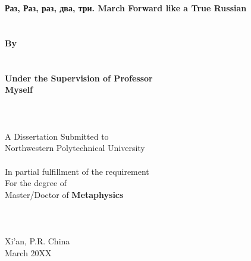 \begin{titlepage}
	\fTNR
	\begin{spacing}{1.2}
		\begin{center}
			\renewcommand{\baselinestretch}{1.2}
			\renewcommand{\captionfont}{\linespread{1.2}\normalsize}
			\setmainfont{\defaultEngFont}
			\sSanhao ~ \\
			\sSanhao ~ \\
			\fTNR \sErhao \textbf{Раз, Раз, раз, два, три. March Forward like a True Russian}
			\fSong \sXiaoer ~ \\
			\fSong \sXiaoer ~ \\
			\fSong \sXiaoer ~ \\
			\fTNR \sXiaosan \textbf{By}\\
			\fTNR \sXiaosan \textbf{\authornameInEnglish}\\
			\fSong \sXiaosan ~ \\
			\fTNR \sXiaosan \textbf{Under the Supervision of Professor}\\
			\fTNR \sXiaosan \textbf{Myself}
			\fSong \sSanhao ~ \\
			\fSong \sSanhao ~ \\
			\fSong \sSanhao ~ \\
			\fSong \sSanhao ~ \\
			\fTNR \sXiaosan A Dissertation Submitted to\\
			\fTNR \sXiaosan Northwestern Polytechnical University \\
			\fSong \sSanhao ~ \\
			\fTNR In partial fulfillment of the requirement \\
			\fTNR For the degree of \\
			\fTNR Master/Doctor of \textbf{Metaphysics}
			\fSong \sXiaosan ~ \\
			\fSong \sXiaosan ~ \\
			\fSong \sXiaosan ~ \\
			\fSong \sXiaosan ~ \\
			\fTNR \sXiaosan Xi'an, P.R. China \\
			\fTNR \sXiaosan March 20XX
		\end{center}
	\end{spacing}
\end{titlepage}

\fSong \normalsize

\endinput